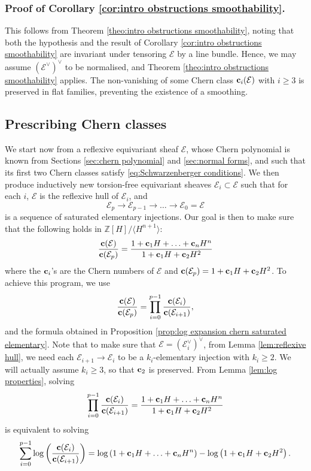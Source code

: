 \documentclass[a4paper,10pt]{amsart}
\theoremstyle{plain}{
    \newtheorem{theorem}{Theorem}[section]
    \newtheorem{lemma}[theorem]{Lemma}
    \newtheorem{corollary}[theorem]{Corollary}
    \newtheorem{proposition}[theorem]{Proposition}
    \newtheorem{conjecture}[theorem]{Conjecture}
}
\theoremstyle{definition}{
    \newtheorem{definition}[theorem]{Definition}
    \newtheorem{defn-thm}[theorem]{Definition-Theorem}
    \newtheorem{example}[theorem]{Example}
    \newtheorem{notation}[theorem]{Notation}
}
\theoremstyle{remark}{
    \newtheorem{remark}[theorem]{Remark}
    \newtheorem{problem}[theorem]{Problem}
    \newtheorem{question}[theorem]{Question}
}
\def\uc{{\bf c}}
\def\cE{\mathcal{E}}
\def\Z{\mathbb{Z}}
\begin{document}
\subsubsection{Proof of Corollary \ref{cor:intro obstructions smoothability}.} This follows from Theorem \ref{theo:intro obstructions smoothability}, noting that both the hypothesis and the result of Corollary \ref{cor:intro obstructions smoothability} are invariant under tensoring $\cE$ by a line bundle. Hence, we may assume $(\cE^\vee)^\vee$ to be normalised, and Theorem \ref{theo:intro obstructions smoothability} applies. The non-vanishing of some Chern class $\uc_i(\cE)$ with $i\geq 3$ is preserved in flat families, preventing the existence of a smoothing.

\subsection{Prescribing Chern classes}
\label{sec:prescription}
We start now from a reflexive equivariant sheaf $\cE$, whose Chern polynomial is known from Sections \ref{sec:chern polynomial} and \ref{sec:normal forms}, and such that its first two Chern classes satisfy \eqref{eq:Schwarzenberger conditions}. We then produce inductively new torsion-free equivariant sheaves $\cE_i\subset\cE$ such that for each $i$, $\cE$ is the reflexive hull of $\cE_i$, and 
$$
\cE_p\to\cE_{p-1}\to\ldots \to \cE_0=\cE
$$
is a sequence of saturated elementary injections. Our goal is then to make sure that the following holds in $\Z[H]/\langle H^{n+1}\rangle$: 
$$
\frac{\uc(\cE)}{\uc(\cE_p)}=\frac{1+\uc_1 H+\ldots+ \uc_nH^n}{1+\uc_1 H+\uc_2 H^2}
$$
where the $\uc_i$'s are the Chern numbers of $\cE$ and $\uc(\cE_p)=1+\uc_1 H+\uc_2 H^2$. To achieve this program, we use
$$
\frac{\uc(\cE)}{\uc(\cE_p)}=\prod_{i=0}^{p-1} \frac{\uc(\cE_i)}{\uc(\cE_{i+1})},
$$
and the formula obtained in Proposition \ref{prop:log expansion chern saturated elementary}. Note that to make sure that $\cE=(\cE_i^\vee)^\vee$, from Lemma \ref{lem:reflexive hull}, we need each $\cE_{i+1}\to\cE_i$ to be a $k_i$-elementary injection with $k_i\geq 2$. We will actually assume $k_i \geq 3$, so that $\uc_2$ is preserved. From Lemma \ref{lem:log properties}, solving 
$$
\prod_{i=0}^{p-1} \frac{\uc(\cE_i)}{\uc(\cE_{i+1})}=\frac{1+\uc_1 H+\ldots+ \uc_nH^n}{1+\uc_1 H+\uc_2 H^2}
$$
is equivalent to solving 
\begin{equation}
 \label{eq:solving log}
\sum_{i=0}^{p-1} \log\left(\frac{\uc(\cE_i)}{\uc(\cE_{i+1})}\right)=\log\left(1+\uc_1 H+\ldots+ \uc_nH^n\right)-\log\left(1+\uc_1 H+\uc_2 H^2\right).
\end{equation}
\end{document}
